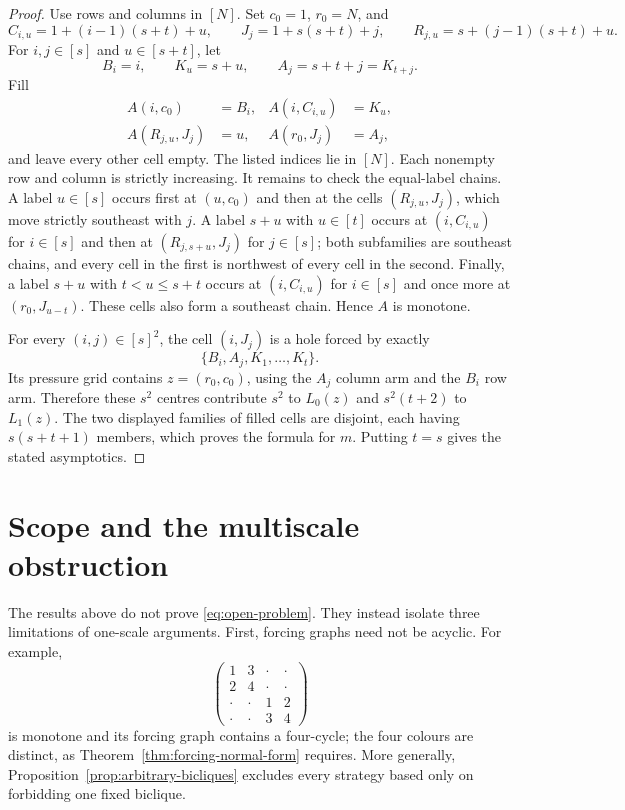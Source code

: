 \documentclass[11pt]{article}
\numberwithin{equation}{section}
\theoremstyle{definition}
\theoremstyle{remark}
\begin{document}
\begin{proof}
Use rows and columns in $[N]$.  Set $c_0=1$, $r_0=N$, and
\[
 C_{i,u}=1+(i-1)(s+t)+u,\qquad
 J_j=1+s(s+t)+j,\qquad
 R_{j,u}=s+(j-1)(s+t)+u.
\]
For $i,j\in[s]$ and $u\in[s+t]$, let
\[
 B_i=i,\qquad K_u=s+u,\qquad A_j=s+t+j=K_{t+j}.
\]
Fill
\begin{align*}
 A(i,c_0)&=B_i,& A(i,C_{i,u})&=K_u,\\
 A(R_{j,u},J_j)&=u,& A(r_0,J_j)&=A_j,
\end{align*}
and leave every other cell empty.  The listed indices lie in $[N]$.  Each
nonempty row and column is strictly increasing.  It remains to check the
equal-label chains.  A label $u\in[s]$ occurs first at $(u,c_0)$ and then at
the cells $(R_{j,u},J_j)$, which move strictly southeast with $j$.  A label
$s+u$ with $u\in[t]$ occurs at $(i,C_{i,u})$ for $i\in[s]$ and then at
$(R_{j,s+u},J_j)$ for $j\in[s]$; both subfamilies are southeast chains, and
every cell in the first is northwest of every cell in the second.  Finally, a
label $s+u$ with $t<u\le s+t$ occurs at $(i,C_{i,u})$ for $i\in[s]$ and once
more at $(r_0,J_{u-t})$.  These cells also form a southeast chain.  Hence $A$
is monotone.

For every $(i,j)\in[s]^2$, the cell $(i,J_j)$ is a hole forced by exactly
\[
 \{B_i,A_j,K_1,\ldots,K_t\}.
\]
Its pressure grid contains $z=(r_0,c_0)$, using the $A_j$ column arm and the
$B_i$ row arm.  Therefore these $s^2$ centres contribute $s^2$ to $L_0(z)$
and $s^2(t+2)$ to $L_1(z)$.  The two displayed families of filled cells are
disjoint, each having $s(s+t+1)$ members, which proves the formula for $m$.
Putting $t=s$ gives the stated asymptotics.
\end{proof}

\section{Scope and the multiscale obstruction}
\label{sec:scope}

The results above do not prove \eqref{eq:open-problem}.  They instead isolate
three limitations of one-scale arguments.  First, forcing graphs need not be
acyclic.  For example,
\[
 \begin{pmatrix}
 1&3&\cdot&\cdot\\
 2&4&\cdot&\cdot\\
 \cdot&\cdot&1&2\\
 \cdot&\cdot&3&4
 \end{pmatrix}
\]
is monotone and its forcing graph contains a four-cycle; the four colours are
distinct, as Theorem~\ref{thm:forcing-normal-form} requires.  More generally,
Proposition~\ref{prop:arbitrary-bicliques} excludes every strategy based only
on forbidding one fixed biclique.
\end{document}

